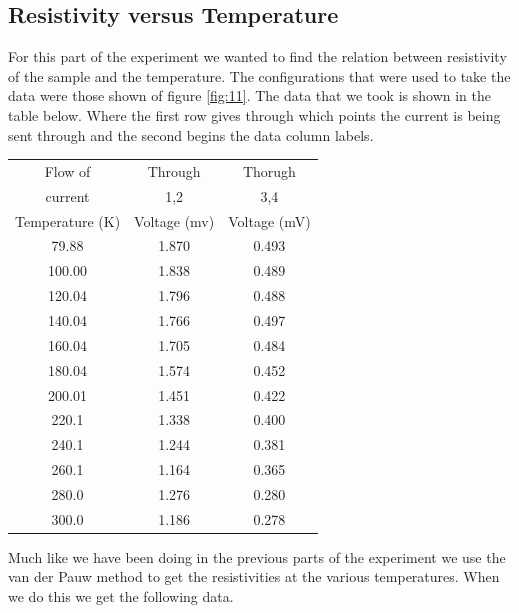 \documentclass[twocolumn]{article}
\begin{document}
\subsection{Resistivity versus Temperature}
For this part of the experiment we wanted to find the relation between 
resistivity of the sample and the temperature. The configurations that were used to 
take the data were those shown of figure \ref{fig:11}. The data that we took 
is shown in the table below. Where the first row gives through which points 
the current is being sent through and the second begins the data column labels.
\begin{minipage}{\linewidth}
\Centering
\begin{tabular}{|c|c|c|}
\hline
Flow of  & Through & Thorugh \\ current & 1,2 & 3,4 \\ \hline \hline
Temperature (K) & Voltage (mv) & Voltage (mV) \\ \hline
79.88 & 1.870 & 0.493 \\ \hline
100.00 & 1.838 & 0.489 \\ \hline
120.04 & 1.796 & 0.488 \\ \hline
140.04 & 1.766 & 0.497 \\ \hline
160.04 & 1.705 & 0.484 \\ \hline
180.04 & 1.574 & 0.452 \\ \hline
200.01 & 1.451 & 0.422 \\ \hline
220.1 & 1.338 & 0.400 \\ \hline
240.1 & 1.244 & 0.381 \\ \hline
260.1 & 1.164 & 0.365 \\ \hline
280.0 & 1.276 & 0.280 \\ \hline
300.0 & 1.186 & 0.278 \\ \hline
\end{tabular}
\label{tbl:9}
\end{minipage}
Much like we have been doing in the previous parts of the experiment we use the 
van der Pauw method to get the resistivities at the various temperatures. When 
we do this we get the following data.
\end{document}
